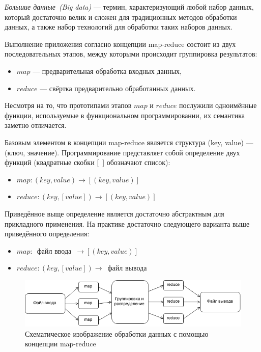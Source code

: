 \documentclass[12pt,a4paper,oneside]{extarticle}
\begin{document}
        {\it Большие данные~(Big data)} --- термин, характеризующий любой набор данных, который достаточно велик и сложен для традиционных методов обработки данных, а также набор технологий для обработки таких наборов данных.
        
        Выполнение приложения согласно концепции map-reduce состоит из двух последовательных этапов, между которыми происходит группировка результатов:
        \begin{itemize}
            \item $map$ --- предварительная обработка входных данных,
            \item $reduce$ --- свёртка предварительно обработанных данных.
        \end{itemize}

        Несмотря на то, что прототипами этапов $map$ и $reduce$ послужили одноимённые функции, используемые в функциональном программировании, их семантика заметно отличается.

        Базовым элементом в концепции map-reduce является структура (key, value) --- (ключ, значение). Программирование представляет собой определение двух функций (квадратные скобки [~] обозначают список):
        \begin{itemize}
            \item $map: (key, value)\rightarrow[(key, value)]$
            \item $reduce: (key, [value])\rightarrow[(key, value)]$
        \end{itemize}

        Приведённое выще определение является достаточно абстрактным для прикладного применения. На практике достаточно следующего варианта выше приведённого определения:
        \begin{itemize}
            \item $map: $~файл ввода~$\rightarrow[(key, value)]$
            \item $reduce: (key, [value])\rightarrow$~файл вывода
        \end{itemize}


        \begin{figure}[h!]
            \centering
            \includegraphics[scale=0.7]{mapreduce.png}
            \caption{Схематическое изображение обработки данных с помощью концепции map-reduce}
            \label{pic:mapreduce}
        \end{figure}
\end{document}
